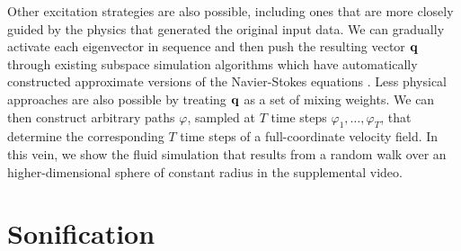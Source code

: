 \documentclass[11pt]{article}
\begin{document}
Other excitation strategies are also possible, including ones that are more closely guided by the physics that generated the original input data. We can gradually activate each eigenvector in sequence and then push the resulting vector $\mathbf{q}$ through existing subspace simulation algorithms which have automatically constructed approximate versions of the Navier-Stokes equations \cite{Kim2013}. Less physical approaches are also possible by treating $\mathbf{q}$ as a set of mixing weights. We can then construct arbitrary paths $\varphi$, sampled at $T$ time steps $\varphi_1, \ldots, \varphi_T$, that determine the corresponding $T$ time steps of a full-coordinate velocity field. In this vein, we show the fluid simulation that results from a random walk over an higher-dimensional sphere of constant radius in the supplemental video. 

\section*{Sonification}
\end{document}
